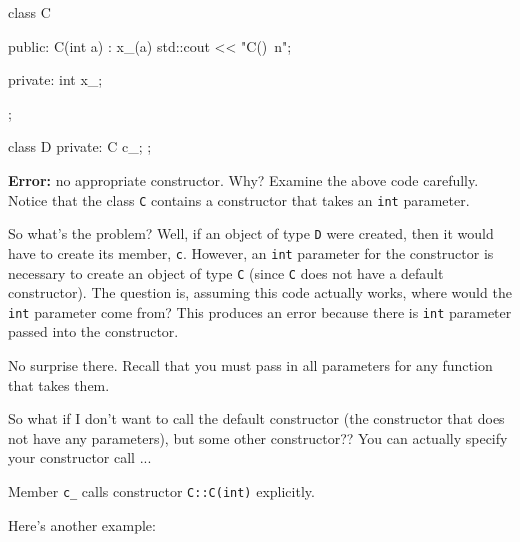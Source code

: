 \begin{console}
class C
{
public:
        C(int a)
              : x_(a)
        {
              std::cout << "C()\ n";
        }
        
private:
        int x_;
};

class D
{
private:
        C c_;
};
\end{console}

\textbf{Error:} no appropriate constructor. Why? Examine the above code
carefully. Notice that the class \texttt{C} contains a constructor that
takes an \texttt{int} parameter.

So what's the problem? Well, if an object of type
\texttt{D} were created, then it would have to create its member,
\texttt{c}. However, an \texttt{int} parameter for the constructor is
necessary to create an object of type \texttt{C} (since \texttt{C} does not
have a default constructor). The question is, assuming this code
actually works, where would the \texttt{int} parameter come from? This
produces an error because there is  \texttt{int} parameter
passed into the constructor.

No surprise there. Recall that you must pass in all parameters for any
function that takes them.

\newpage{}

So what if I don't want to call the default constructor
(the constructor that does not have any parameters), but some other
constructor?? You can actually specify your constructor call ...


Member \texttt{c_} calls constructor \texttt{C::C(int)} explicitly.

Here's another example:


